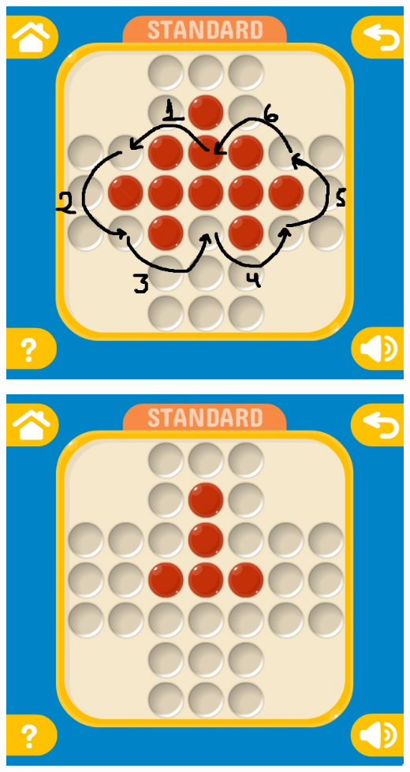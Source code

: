 \documentclass[10pt,a4paper]{report}
\begin{document}
\begin{center}
	\includegraphics[scale=.3]{15.jpg} \hspace{6cm}
	
	\includegraphics[scale=.3]{16.jpg} \hspace{6cm}
\end{center}
\end{document}
